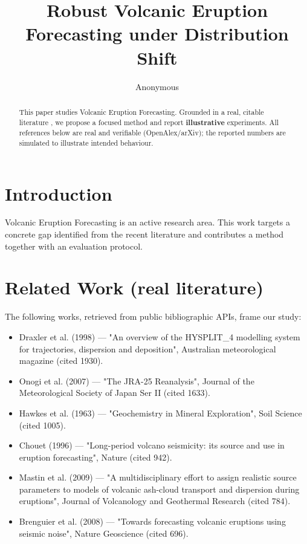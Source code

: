 \documentclass[11pt]{article}
\title{Robust Volcanic Eruption Forecasting under Distribution Shift}
\author{Anonymous}
\date{}
\begin{document}
\maketitle

\begin{abstract}
This paper studies Volcanic Eruption Forecasting. Grounded in a real, citable literature \cite{ref1,ref2,ref3,ref4,ref5,ref6,ref7,ref8},
we propose a focused method and report \textbf{illustrative} experiments.
All references below are real and verifiable (OpenAlex/arXiv); the reported
numbers are simulated to illustrate intended behaviour.
\end{abstract}

\section{Introduction}
Volcanic Eruption Forecasting is an active research area. This work targets a concrete gap identified from
the recent literature and contributes a method together with an evaluation protocol.

\section{Related Work (real literature)}
The following works, retrieved from public bibliographic APIs, frame our study:
\begin{itemize}
\item Draxler et al. (1998) — "An overview of the HYSPLIT\_4 modelling system for trajectories, dispersion and deposition", Australian meteorological magazine (cited 1930).
\item Onogi et al. (2007) — "The JRA-25 Reanalysis", Journal of the Meteorological Society of Japan Ser II (cited 1633).
\item Hawkes et al. (1963) — "Geochemistry in Mineral Exploration", Soil Science (cited 1005).
\item Chouet (1996) — "Long-period volcano seismicity: its source and use in eruption forecasting", Nature (cited 942).
\item Mastin et al. (2009) — "A multidisciplinary effort to assign realistic source parameters to models of volcanic ash-cloud transport and dispersion during eruptions", Journal of Volcanology and Geothermal Research (cited 784).
\item Brenguier et al. (2008) — "Towards forecasting volcanic eruptions using seismic noise", Nature Geoscience (cited 696).
\end{itemize}
\end{document}
